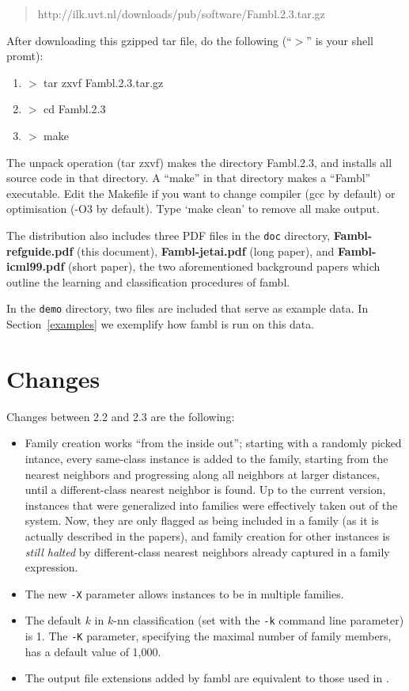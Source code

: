 \documentclass[11pt]{article}
\begin{document}
\begin{quote}
	http://ilk.uvt.nl/downloads/pub/software/Fambl.2.3.tar.gz
\end{quote}

After downloading this gzipped tar file, do the following (``$>$'' is
your shell promt):

\begin{enumerate}
\item
$>$ tar zxvf Fambl.2.3.tar.gz
\item
$>$ cd Fambl.2.3
\item
$>$ make
\end{enumerate}

The unpack operation (tar zxvf) makes the directory Fambl.2.3, and
installs all source code in that directory. A ``make'' in that
directory makes a ``Fambl'' executable. Edit the Makefile if you want
to change compiler (gcc by default) or optimisation (-O3 by
default). Type `make clean' to remove all make output.

The distribution also includes three PDF files in the {\tt doc}
directory, {\bf Fambl-refguide.pdf} (this document), {\bf
  Fambl-jetai.pdf} (long paper), and {\bf Fambl-icml99.pdf} (short
paper), the two aforementioned background papers which outline the
learning and classification procedures of {\sc fambl}.

In the {\tt demo} directory, two files are included that serve as
example data. In Section~\ref{examples} we exemplify how {\sc fambl}
is run on this data.

\section{Changes}
\label{changes}

Changes between 2.2 and 2.3 are the following:

\begin{itemize}
\item
Family creation works ``from the inside out''; starting with a
randomly picked intance, every same-class instance is added to the
family, starting from the nearest neighbors and progressing along all
neighbors at larger distances, until a different-class nearest
neighbor is found. Up to the current version, instances that were
generalized into families were effectively taken out of the
system. Now, they are only flagged as being included in a family (as
it is actually described in the papers), and family creation for other
instances is {\em still halted}\/ by different-class nearest neighbors
already captured in a family expression.
\item
The new {\tt -X} parameter allows instances to be in multiple families.
\item
The default $k$ in $k$-{\sc nn} classification (set with the {\tt -k}
command line parameter) is 1. The {\tt -K} parameter, specifying the
maximal number of family members, has a default value of 1,000.
\item
The output file extensions added by {\sc fambl} are equivalent to
those used in {}.
\end{itemize}
\end{document}
